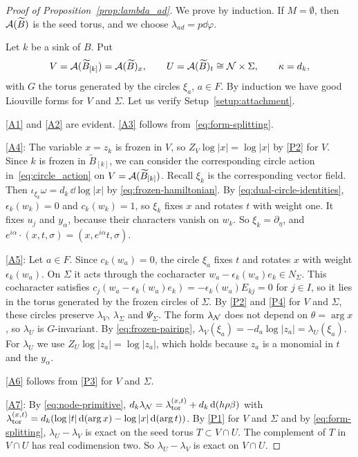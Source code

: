 \documentclass[12pt, letter]{amsart}
\theoremstyle{definition}
\begin{document}
\begin{proof}[Proof of Proposition~\ref{prop:lambda_ad}]

We prove by induction.
If $M=\emptyset$, then $\mathcal{A}(\widetilde B)$ is the seed torus, and we choose \(\lambda_{ad} = p \dd \varphi\). 

Let $k$ be a sink of $B$. 
Put
\[
 V=\mathcal{A}(\widetilde B_{[k]}) = \mathcal{A}(\widetilde B)_x,\qquad U=\mathcal{A}(\widetilde B)_t\cong\mathcal{N}\times\Sigma,\qquad \kappa=d_k,
\]
with $G$ the torus generated by the circles $\xi_a$, $a\in F$. By induction we have good Liouville forms for \(V\) and \(\Sigma\). 
Let us verify Setup~\ref{setup:attachment}. 

\ref{A1} and \ref{A2} are evident. \ref{A3} follows from~\eqref{eq:form-splitting}.

\ref{A4}: The variable $x=z_k$ is frozen in $V$, so $Z_V\log|x|=\log|x|$ by \ref{P2} for $V$.
Since $k$ is frozen in $\widetilde B_{[k]}$, 
we can consider the corresponding circle action in~\eqref{eq:circle_action} on \(V = \mathcal{A}(\widetilde B_{[k]})\). 
Recall \(\xi_k\) is the corresponding vector field.
Then $\iota_{\xi_k}\omega=d_k\,\dd\log|x|$ by \eqref{eq:frozen-hamiltonian}.
By \eqref{eq:dual-circle-identities}, $\epsilon_k(w_k)=0$ and $c_k(w_k)=1$, so $\xi_k$ fixes $x$ and rotates $t$ with weight one.
It fixes $u_j$ and $y_\alpha$, because their characters vanish on $w_k$.
So $\xi_k=\partial_\eta$, and $e^{i\alpha}\cdot(x,t,\sigma)=(x,e^{i\alpha}t,\sigma)$.

\ref{A5}: Let $a\in F$.
Since $c_k(w_a)=0$, the circle $\xi_a$ fixes $t$ and rotates $x$ with weight $\epsilon_k(w_a)$.
On $\Sigma$ it acts through the cocharacter $w_a-\epsilon_k(w_a)e_k\in N_\Sigma$.
This cocharacter satisfies $c_j(w_a-\epsilon_k(w_a)e_k)=-\epsilon_k(w_a)E_{kj}=0$ for $j\in I$, so it lies in the torus generated by the frozen circles of $\Sigma$.
By \ref{P2} and \ref{P4} for $V$ and $\Sigma$, these circles preserve $\lambda_V$, $\lambda_\Sigma$ and $\Psi_\Sigma$.
The form $\lambda_{\mathcal{N}}$ does not depend on $\theta=\arg x$, so $\lambda_U$ is $G$-invariant.
By \eqref{eq:frozen-pairing}, $\lambda_V(\xi_a)=-d_a\log|z_a|=\lambda_U(\xi_a)$.
For $\lambda_U$ we use $Z_U\log|z_a|=\log|z_a|$, which holds because $z_a$ is a monomial in $t$ and the $y_\alpha$.

\ref{A6} follows from \ref{P3} for $V$ and $\Sigma$.

\ref{A7}: By \eqref{eq:node-primitive}, $d_k\lambda_{\mathcal{N}}=\lambda_{\mathrm{tor}}^{(x,t)}+d_k\,\mathrm{d}(h\rho\beta)$ with $\lambda_{\mathrm{tor}}^{(x,t)}=d_k(\log|t|\,\mathrm{d}(\arg x)-\log|x|\,\mathrm{d}(\arg t))$.
By \ref{P1} for $V$ and $\Sigma$ and by \eqref{eq:form-splitting}, $\lambda_U-\lambda_V$ is exact on the seed torus $T\subset V\cap U$.
The complement of $T$ in $V\cap U$ has real codimension two.
So $\lambda_U-\lambda_V$ is exact on $V\cap U$.


\end{proof}
\end{document}
